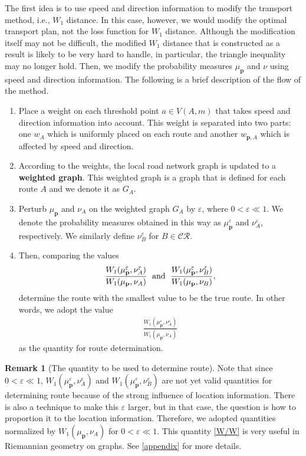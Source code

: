 \documentclass{article}
\numberwithin{equation}{section}
\theoremstyle{definition}
\newtheorem{remark}[remark]{Remark}
\newcommand{\CR}{\mathcal{CR}}
\newcommand{\eps}{\varepsilon} %
\begin{document}
The first idea is to use speed and direction information to modify the transport method, i.e., $W_1$ distance.
In this case, however, we would modify the optimal transport plan, not the loss function for $W_1$ distance.
Although the modification itself may not be difficult, the modified $W_1$ distance that is constructed as a result is likely to be very hard to handle, in particular, the triangle inequality may no longer hold.
Then, we modify the probability measures $\mu_\mathbf{p}$ and $\nu$ using speed and direction information.
The following is a brief description of the flow of the method.
\begin{enumerate}
    \item Place a weight on each threshold point $a\in V(A,m)$ that takes speed and direction information into account.
    This weight is separated into two parts: 
    one $w_A$ which is uniformly placed on each route and another $w_{\mathbf{p},A}$ which is affected by speed and direction.
    \item According to the weights, the local road network graph is updated to a \textbf{weighted graph}.
    This weighted graph is a graph that is defined for each route $A$ and we denote it as $G_A$.
    \item Perturb $\mu_\mathbf{p}$ and $\nu_A$ on the weighted graph $G_A$ by $\eps$, where $0<\eps\ll1$.
    We denote the probability measures obtained in this way as $\mu_\mathbf{p}^\eps$ and $\nu_A^\eps$, respectively.
    We similarly define $\nu_B^\eps$ for $B\in\CR$.
    \item Then, comparing the values 
    \begin{align*}
        \frac{W_1(\mu_\mathbf{p}^\eps,\nu_A^\eps)}{W_1(\mu_\mathbf{p},\nu_A)} \text{\; and \;} 
        \frac{W_1(\mu_\mathbf{p}^\eps,\nu_B^\eps)}{W_1(\mu_\mathbf{p},\nu_B)},
    \end{align*}
    determine the route with the smallest value to be the true route.
    In other words, we adopt the value 
    \begin{align}
        \frac{W_1(\mu_\mathbf{p}^\eps,\nu_A^\eps)}{W_1(\mu_\mathbf{p},\nu_A)} \label{W/W}
    \end{align}
    as the quantity for route determination.
\end{enumerate}

\begin{remark}[The quantity to be used to determine route]
    Note that since $0<\eps\ll1$, $W_1(\mu_\mathbf{p}^\eps,\nu_A^\eps)$ and $W_1(\mu_\mathbf{p}^\eps,\nu_B^\eps)$ are not yet valid quantities for determining route because of the strong influence of location information.
    There is also a technique to make this $\eps$ larger, but in that case, the question is how to proportion it to the location information.
    Therefore, we adopted quantities normalized by $W_1(\mu_\mathbf{p},\nu_A)$ for $0<\eps\ll1$.
    This quantity \eqref{W/W} is very useful in Riemannian geometry on graphs.
    See \autoref{appendix} for more details.
\end{remark}
\end{document}
